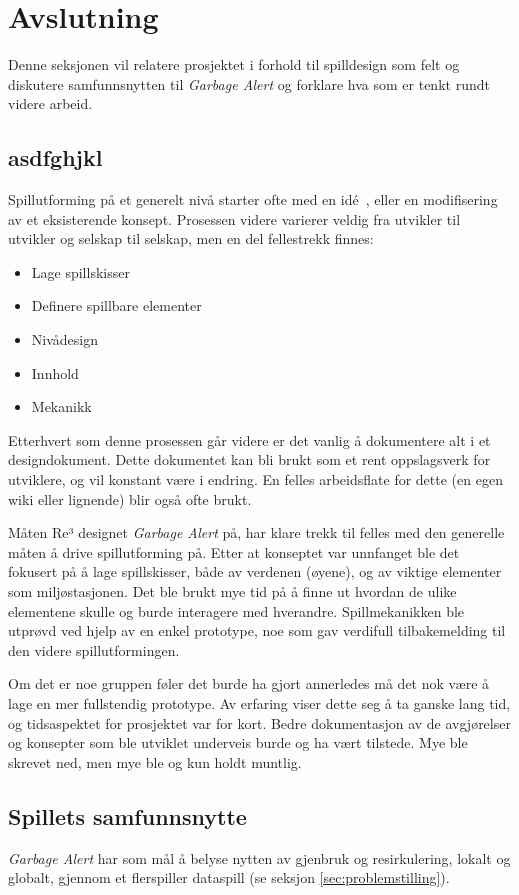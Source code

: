 \section{Avslutning}\label{sec:conclusion}
Denne seksjonen vil relatere prosjektet i forhold til spilldesign som
felt og diskutere samfunnsnytten til \emph{Garbage Alert} og forklare hva som er tenkt
rundt videre arbeid.

\subsection{asdfghjkl}
Spillutforming på et generelt nivå starter ofte med en idé~\cite{bates},
eller en modifisering av et eksisterende konsept. Prosessen videre
varierer veldig fra utvikler til utvikler og selskap til selskap, men en
del fellestrekk finnes:
\begin{itemize}
\item Lage spillskisser
\item Definere spillbare elementer
\item Nivådesign
\item Innhold
\item Mekanikk
\end{itemize}
Etterhvert som denne prosessen går videre er det vanlig å dokumentere
alt i et designdokument. Dette dokumentet kan bli brukt som et rent
oppslagsverk for utviklere, og vil konstant være i endring. En felles
arbeidsflate for dette (en egen wiki eller lignende) blir også ofte brukt.

Måten Re³ designet \emph{Garbage Alert} på, har klare trekk til felles med den generelle
måten å drive spillutforming på. Etter at konseptet var unnfanget ble
det fokusert på å lage spillskisser, både av verdenen (øyene), og av
viktige elementer som miljøstasjonen. Det ble brukt mye tid på å finne
ut hvordan de ulike elementene skulle og burde interagere med hverandre.
Spillmekanikken ble utprøvd ved hjelp av en enkel prototype, noe som gav
verdifull tilbakemelding til den videre spillutformingen.

Om det er noe gruppen føler det burde ha gjort annerledes må det nok
være å lage en mer fullstendig prototype. Av erfaring viser dette seg å
ta ganske lang tid, og tidsaspektet for prosjektet var for kort. Bedre dokumentasjon av de avgjørelser og konsepter som ble utviklet underveis burde og ha vært tilstede. Mye ble skrevet ned, men mye ble og kun holdt muntlig.

\subsection{Spillets samfunnsnytte}
\emph{Garbage Alert} har som mål å belyse nytten av gjenbruk og resirkulering, lokalt og globalt, gjennom et flerspiller dataspill (se seksjon \ref{sec:problemstilling}).


